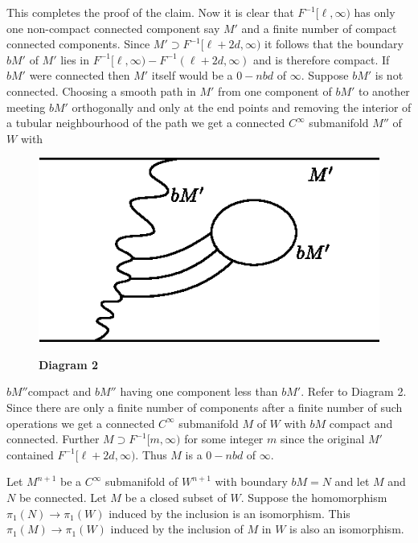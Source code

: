 This completes the proof of the claim. Now it is clear that $F^{-1} 
[\ell, \infty)$ has only one non-compact connected component say $M'$
  and a finite number of compact connected components. Since $M'
  \supset F^{-1}[\ell + 2d, \infty)$ it follows that the boundary
    $bM'$ of $M'$ lies in $F^{-1}[\ell,\infty) - F ^{-1}(\ell + 2d,
      \infty)$ and is therefore compact. If $bM'$ were connected then
      $M'$ itself would be a $0 - nbd$ of $\infty$. Suppose $bM'$ is
      not connected. Choosing a smooth path in $M'$ from one component
      of $bM'$ to another meeting $bM'$ orthogonally and only at the
      end points and removing the interior of a tubular neighbourhood
      of the path we get a connected $C^\infty$ submanifold $M''$ of
      $W$ with  

\begin{figure}[H]
\centering
\includegraphics{vol46-fig/fig46-1.eps}
\centerline{\bf Diagram 2}
\end{figure}

$bM''$\pageoriginale compact and $bM''$ having one component less than
$bM'$. Refer 
to Diagram 2. Since there are only a finite number
of components after 
a finite number of such operations we get a connected $C^\infty$
submanifold $M$ of $W$ with $bM$ compact and connected. Further $M
\supset F^{-1} [m,\infty)$ for some integer $m$ since the original
  $M'$ contained $F^{-1} [\ell + 2d, \infty)$. Thus $M$ is a $0 - nbd$
    of $\infty$. 

\setcounter{lemma}{7}
\begin{lemma}\label{chap2:lem2.8}%
Let $M^{n+1}$ be a $C^\infty$ submanifold of $W^{n+1}$ with boundary
$bM = N$ and let $M$ and $N$ be connected. Let $M$ be a closed subset
of $W$. Suppose the homomorphism $\pi_1 (N) \to \pi_1(W)$ induced by
the inclusion is an isomorphism. This $\pi_1 (M) \to \pi_1 (W)$
induced by the inclusion of $M$ in $W$ is also an isomorphism. 
\end{lemma}

